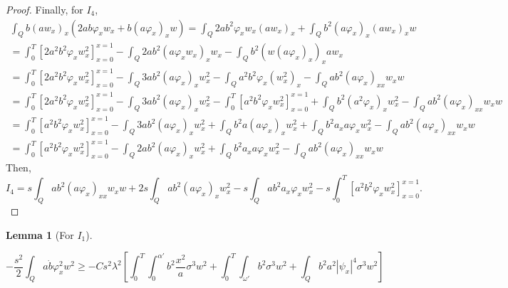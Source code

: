 \documentclass[11pt,oneside,a4papper]{osajnl}
\newtheorem{lema}{Lemma}
\begin{document}
\begin{proof}
Finally, for $I_4$,
\begin{multline*}
	\int_{Q}  b(a w_x)_x \left( 2ab\varphi_x w_x+b(a\varphi_x)_x w  \right) =\int_{Q}2ab^2\varphi_x w_x(a w_x)_x+\int_{Q}b^2(a\varphi_x)_x(a w_x)_x w \\
	=\int_{0}^{T}\left[2a^2b^2\varphi_x w_x^2\right]^{x=1}_{x=0}-\int_{Q}2ab^2(a\varphi_x w_x)_xw_x-\int_{Q}b^2(w(a\varphi_x)_x)_xa w_x\\
	=\int_{0}^{T}\left[2a^2b^2\varphi_x w_x^2\right]^{x=1}_{x=0}-\int_{Q}3ab^2(a\varphi_x )_xw_x^2-\int_{Q}a^2b^2\varphi_x (w_{x}^2)_x -\int_{Q}ab^2(a\varphi_x)_{xx} w_x w\\
	=\int_{0}^{T}\left[2a^2b^2\varphi_x w_x^2\right]^{x=1}_{x=0}-\int_{Q}3ab^2(a\varphi_x )_xw_x^2-\int_{0}^{T}\left[a^2b^2\varphi_x w_x^2\right]^{x=1}_{x=0}+\int_{Q}b^2 (a^2\varphi_x)_xw_{x}^2 -\int_{Q}ab^2(a\varphi_x)_{xx} w_x w
	\\
	=\int_{0}^{T}\left[a^2b^2\varphi_x w_x^2\right]^{x=1}_{x=0}-\int_{Q}3ab^2(a\varphi_x )_xw_x^2+\int_{Q}b^2 a(a\varphi_x)_xw_{x}^2 +\int_{Q}b^2 a_x a\varphi_xw_{x}^2-\int_{Q}ab^2(a\varphi_x)_{xx} w_x w
	\\
	=\int_{0}^{T}\left[a^2b^2\varphi_x w_x^2\right]^{x=1}_{x=0}-\int_{Q}2ab^2(a\varphi_x )_xw_x^2 +\int_{Q}b^2 a_x a\varphi_xw_{x}^2-\int_{Q}ab^2(a\varphi_x)_{xx} w_x w
\end{multline*}
Then,
$$I_4=s\int_{Q}ab^2(a\varphi_x)_{xx} w_x w+2s\int_{Q}ab^2(a\varphi_x )_xw_x^2-s\int_{Q}ab^2 a_x \varphi_xw_{x}^2-s\int_{0}^{T}\left[a^2b^2\varphi_x w_x^2\right]^{x=1}_{x=0}.$$
\end{proof}



\begin{lema}[For $I_1$]\label{lemaA2}

$$- \frac{s^2}{2} \int_{Q}a\dot{b}\varphi_{x}^2 w^2 \geq - Cs^2\lambda^2\left[ \int_0^T \int_0^{\alpha'} b^2 \frac{x^2}{a} \sigma^3 w^2 + \int_0^T\int_{\omega'} b^2 \sigma^3 w^2 + \int_Q b^2 a^2 |\psi_x|^4 \sigma^3 w^2   \right]$$
\end{lema}	
\end{document}
